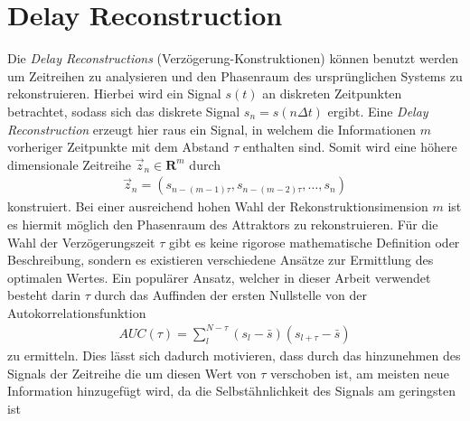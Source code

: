 \section{Delay Reconstruction}
\label{sc:delay_reconstruction}
Die \textit{Delay Reconstructions} (Verzögerung-Konstruktionen) können benutzt werden um Zeitreihen zu analysieren und den Phasenraum des ursprünglichen Systems zu rekonstruieren.
Hierbei wird ein Signal $s(t)$ an diskreten Zeitpunkten betrachtet, sodass sich das diskrete Signal $s_n = s(n\Delta t)$ ergibt. Eine \textit{Delay Reconstruction} erzeugt hier raus ein Signal, in welchem die Informationen $m$ vorheriger Zeitpunkte mit dem Abstand $\tau$ enthalten sind. Somit wird eine höhere dimensionale Zeitreihe $\vec{z}_n \in \mathbf{R}^{m}$ durch
\begin{align}
	\vec{z}_n = \left(s_{n-(m-1)\tau}, s_{n-(m-2)\tau}, \ldots ,s_n \right)
\end{align} 
konstruiert. Bei einer ausreichend hohen Wahl der Rekonstruktionsimension $m$ ist es hiermit möglich den Phasenraum des Attraktors zu rekonstruieren. Für die Wahl der Verzögerungszeit $\tau$ gibt es keine rigorose mathematische Definition oder Beschreibung, sondern es existieren verschiedene Ansätze zur Ermittlung des optimalen Wertes. Ein populärer Ansatz, welcher in dieser Arbeit verwendet besteht darin $\tau$ durch das Auffinden der ersten Nullstelle von der Autokorrelationsfunktion 
\begin{align}
AUC(\tau) = \sum_l^{N-\tau} (s_l-\bar{s})(s_{l+\tau}-\bar{s})
\end{align}   
zu ermitteln. Dies lässt sich dadurch motivieren, dass durch das hinzunehmen des Signals der Zeitreihe die um diesen Wert von $\tau$ verschoben ist, am meisten neue Information hinzugefügt wird, da die Selbstähnlichkeit des Signals am geringsten ist \citep[30\,ff.]{kantz2004nonlinear}